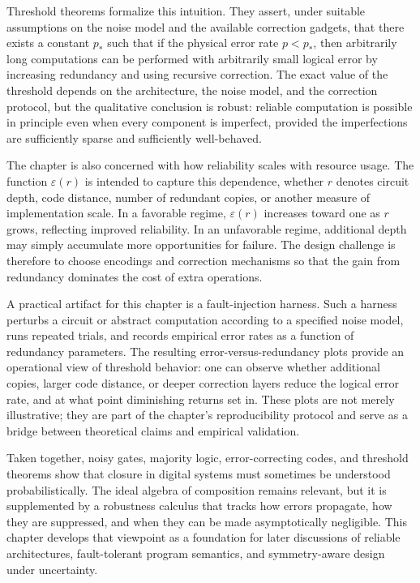 \documentclass[11pt]{article}
\begin{document}
Threshold theorems formalize this intuition. They assert, under suitable assumptions on the noise model and the available correction gadgets, that there exists a constant \(p_{\ast}\) such that if the physical error rate \(p < p_{\ast}\), then arbitrarily long computations can be performed with arbitrarily small logical error by increasing redundancy and using recursive correction. The exact value of the threshold depends on the architecture, the noise model, and the correction protocol, but the qualitative conclusion is robust: reliable computation is possible in principle even when every component is imperfect, provided the imperfections are sufficiently sparse and sufficiently well-behaved.

The chapter is also concerned with how reliability scales with resource usage. The function \(\varepsilon(r)\) is intended to capture this dependence, whether \(r\) denotes circuit depth, code distance, number of redundant copies, or another measure of implementation scale. In a favorable regime, \(\varepsilon(r)\) increases toward one as \(r\) grows, reflecting improved reliability. In an unfavorable regime, additional depth may simply accumulate more opportunities for failure. The design challenge is therefore to choose encodings and correction mechanisms so that the gain from redundancy dominates the cost of extra operations.

A practical artifact for this chapter is a fault-injection harness. Such a harness perturbs a circuit or abstract computation according to a specified noise model, runs repeated trials, and records empirical error rates as a function of redundancy parameters. The resulting error-versus-redundancy plots provide an operational view of threshold behavior: one can observe whether additional copies, larger code distance, or deeper correction layers reduce the logical error rate, and at what point diminishing returns set in. These plots are not merely illustrative; they are part of the chapter's reproducibility protocol and serve as a bridge between theoretical claims and empirical validation.

Taken together, noisy gates, majority logic, error-correcting codes, and threshold theorems show that closure in digital systems must sometimes be understood probabilistically. The ideal algebra of composition remains relevant, but it is supplemented by a robustness calculus that tracks how errors propagate, how they are suppressed, and when they can be made asymptotically negligible. This chapter develops that viewpoint as a foundation for later discussions of reliable architectures, fault-tolerant program semantics, and symmetry-aware design under uncertainty.
\end{document}
